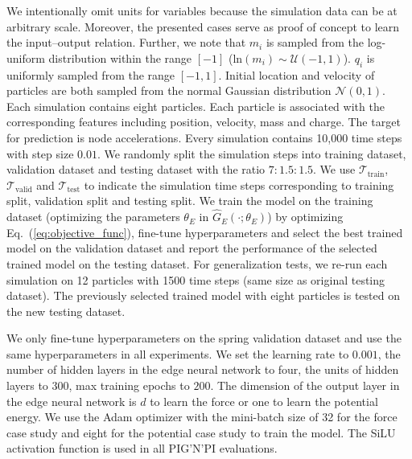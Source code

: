 \documentclass{article}
\newcommand{\pignpi}{PIG'N'PI\xspace}
\begin{document}
We intentionally omit units for variables because the simulation data can be at arbitrary scale. Moreover, the presented cases serve as proof of concept to learn the input–output relation.
Further, we note that $m_i$ is sampled from the log-uniform distribution within the range $[- 1]$ ($\text{ln}(m_i) \sim \mathcal{U}(-1, 1)$). $q_i$ is uniformly sampled from the range $[-1, 1]$. Initial location and velocity of particles are both sampled from the normal Gaussian distribution $\mathcal{N}(0, 1)$. 
Each simulation contains eight particles. Each particle is associated with the corresponding features including position, velocity, mass and charge. The target for prediction is node accelerations. Every simulation contains 10,000 time steps with step size $0.01$. We randomly split the simulation steps into training dataset, validation dataset and testing dataset with the ratio $7:1.5:1.5$. We use $\mathcal{T}_{\text{train}}$, $\mathcal{T}_{\text{valid}}$ and $\mathcal{T}_{\text{test}}$ to indicate the simulation time steps corresponding to training split, validation split and testing split.  We train the model on the training dataset (optimizing the parameters $\theta_{E}$ in $\hat{G}_E( \cdot ; \theta_{E} )$) by optimizing Eq.~(\ref{eq:objective_func}), fine-tune
hyperparameters and select the best trained model on the validation dataset and report the performance of the selected trained model on the testing dataset. For generalization tests, we re-run each simulation on 12 particles with 1500 time steps (same size as original testing dataset). The previously selected trained model with eight particles is tested on the new testing dataset.


We only fine-tune hyperparameters on the spring validation dataset and use the same hyperparameters in all experiments. We set the learning rate to  $0.001$, the number of hidden layers in the edge neural network  to four, the units of hidden layers to $300$, max training epochs to $200$. The dimension of the output layer in the edge neural network is $d$ to learn the force or one to learn the potential energy. We use the Adam optimizer with the mini-batch size of 32 for the force case study and eight for the potential  case study to train the model. 
The SiLU activation function is used in all \pignpi evaluations.  

\end{document}
